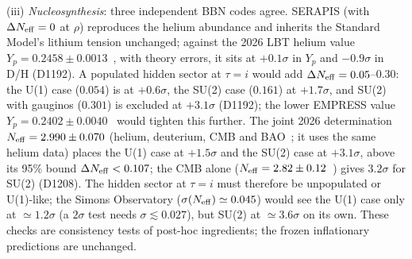 \documentclass[aps,prd,twocolumn,superscriptaddress,nofootinbib,floatfix]{revtex4-2}
\begin{document}
(iii) \emph{Nucleosynthesis}: three independent BBN codes agree. SERAPIS (with $\Delta N_{\rm eff}=0$ at $\rho$) reproduces the helium abundance and inherits the Standard Model's lithium tension unchanged; against the 2026 LBT helium value $Y_p=0.2458\pm0.0013$~\cite{arXiv_2601_22239}, with theory errors, it sits at $+0.1\sigma$ in $Y_p$ and $-0.9\sigma$ in D/H (D1192). A populated hidden sector at $\tau=i$ would add $\Delta N_{\rm eff}=0.05$--$0.30$: the U(1) case ($0.054$) is at $+0.6\sigma$, the SU(2) case ($0.161$) at $+1.7\sigma$, and SU(2) with gauginos ($0.301$) is excluded at $+3.1\sigma$ (D1192); the lower EMPRESS value $Y_p=0.2402\pm0.0040$~\cite{arXiv_2506_24050} would tighten this further. The joint 2026 determination $N_{\rm eff}=2.990\pm0.070$ (helium, deuterium, CMB and BAO~\cite{arXiv_2603_13226}; it uses the same helium data) places the U(1) case at $+1.5\sigma$ and the SU(2) case at $+3.1\sigma$, above its 95\% bound $\Delta N_{\rm eff}<0.107$; the CMB alone ($N_{\rm eff}=2.82\pm0.12$~\cite{arXiv_2608_07453}) gives $3.2\sigma$ for SU(2) (D1208). The hidden sector at $\tau=i$ must therefore be unpopulated or U(1)-like; the Simons Observatory ($\sigma(N_{\rm eff})\simeq0.045$) would see the U(1) case only at $\simeq1.2\sigma$ (a $2\sigma$ test needs $\sigma\lesssim0.027$), but SU(2) at $\simeq3.6\sigma$ on its own.
These checks are consistency tests of post-hoc ingredients; the frozen inflationary predictions are unchanged.
\end{document}
